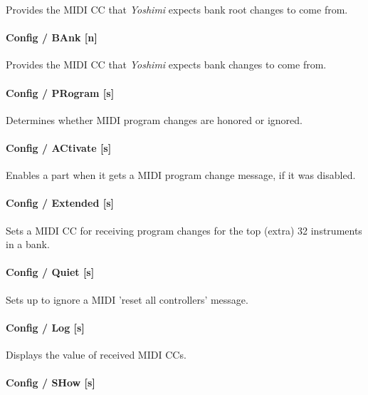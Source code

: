    Provides the MIDI CC that \textsl{Yoshimi} expects bank root changes to come
   from.

\paragraph{Config / BAnk [n]}
\label{paragraph:command_line_config_bank}

   Provides the MIDI CC that \textsl{Yoshimi} expects bank changes to come from.

\paragraph{Config / PRogram [s]}
\label{paragraph:command_line_config_program}

   Determines whether MIDI program changes are honored or ignored.

\paragraph{Config / ACtivate [s]}
\label{paragraph:command_line_config_activate}

   Enables a part when it gets a MIDI program change message,
   if it was disabled.

\paragraph{Config / Extended [s]}
\label{paragraph:command_line_config_extended}

   Sets a MIDI CC for receiving program changes for the top (extra)
   32 instruments in a bank.

\paragraph{Config / Quiet [s]}
\label{paragraph:command_line_config_quiet}

   Sets up to ignore a MIDI 'reset all controllers' message.

\paragraph{Config / Log [s]}
\label{paragraph:command_line_config_log}

   Displays the value of received MIDI CCs.

\paragraph{Config / SHow [s]}
\label{paragraph:command_line_config_show}

